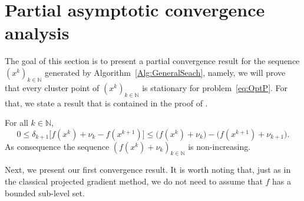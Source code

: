 \section{Partial asymptotic convergence analysis} \label{Sec:PartialConvRes}
The goal  of this section is to present a partial  convergence result for  the sequence $(x^k)_{k\in\mathbb{N}}$ generated by Algorithm~\ref{Alg:GeneralSeach}, namely, we will prove that every cluster point of $(x^k)_{k\in\mathbb{N}}$ is stationary for problem~\eqref{eq:OptP}.  For that, we state a result that is contained in the proof of \cite[Theorem 4]{GrapigliaSachs2017}.
\begin{lemma} \label{le:fkvk}
	For all $k \in \mathbb{N}$,
	$$
		0\leq \delta_{k+1}\big[ f(x^{k})+\nu_{k}-  f(x^{k+1})\big] \leq \big( f(x^{k})+\nu_{k}\big) - \big( f(x^{k+1})+\nu_{k+1}\big).
	$$
	As consequence the sequence   $\left(f(x^k)+\nu_k\right)_{k\in\mathbb{N}}$ is    non-increasing.
\end{lemma}

Next, we present our first convergence result. It is worth noting that, just as in the classical projected gradient method, we do not need to assume that $f$ has a bounded sub-level  set.

